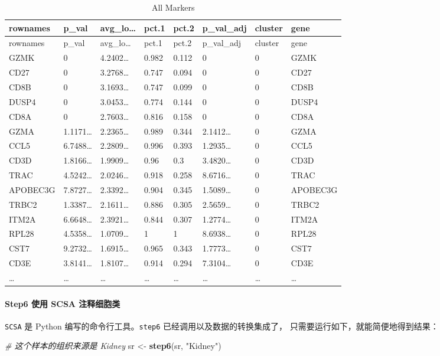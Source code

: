 \documentclass[
]{article}
\newenvironment{Shaded}{\begin{snugshade}}{\end{snugshade}}
\newcommand{\CommentTok}[1]{\textcolor[rgb]{0.56,0.35,0.01}{\textit{#1}}}
\newcommand{\KeywordTok}[1]{\textcolor[rgb]{0.13,0.29,0.53}{\textbf{#1}}}
\newcommand{\NormalTok}[1]{#1}
\newcommand{\StringTok}[1]{\textcolor[rgb]{0.31,0.60,0.02}{#1}}
\begin{document}
\begin{longtable}[]{@{}llllllll@{}}
\caption{\label{tab:All-Markers}All Markers}\tabularnewline
\toprule
rownames & p\_val & avg\_lo\ldots{} & pct.1 & pct.2 & p\_val\_adj & cluster & gene\tabularnewline
\midrule
\endfirsthead
\toprule
rownames & p\_val & avg\_lo\ldots{} & pct.1 & pct.2 & p\_val\_adj & cluster & gene\tabularnewline
\midrule
\endhead
GZMK & 0 & 4.2402\ldots{} & 0.982 & 0.112 & 0 & 0 & GZMK\tabularnewline
CD27 & 0 & 3.2768\ldots{} & 0.747 & 0.094 & 0 & 0 & CD27\tabularnewline
CD8B & 0 & 3.1693\ldots{} & 0.747 & 0.099 & 0 & 0 & CD8B\tabularnewline
DUSP4 & 0 & 3.0453\ldots{} & 0.774 & 0.144 & 0 & 0 & DUSP4\tabularnewline
CD8A & 0 & 2.7603\ldots{} & 0.816 & 0.158 & 0 & 0 & CD8A\tabularnewline
GZMA & 1.1171\ldots{} & 2.2365\ldots{} & 0.989 & 0.344 & 2.1412\ldots{} & 0 & GZMA\tabularnewline
CCL5 & 6.7488\ldots{} & 2.2809\ldots{} & 0.996 & 0.393 & 1.2935\ldots{} & 0 & CCL5\tabularnewline
CD3D & 1.8166\ldots{} & 1.9909\ldots{} & 0.96 & 0.3 & 3.4820\ldots{} & 0 & CD3D\tabularnewline
TRAC & 4.5242\ldots{} & 2.0246\ldots{} & 0.918 & 0.258 & 8.6716\ldots{} & 0 & TRAC\tabularnewline
APOBEC3G & 7.8727\ldots{} & 2.3392\ldots{} & 0.904 & 0.345 & 1.5089\ldots{} & 0 & APOBEC3G\tabularnewline
TRBC2 & 1.3387\ldots{} & 2.1611\ldots{} & 0.886 & 0.305 & 2.5659\ldots{} & 0 & TRBC2\tabularnewline
ITM2A & 6.6648\ldots{} & 2.3921\ldots{} & 0.844 & 0.307 & 1.2774\ldots{} & 0 & ITM2A\tabularnewline
RPL28 & 4.5358\ldots{} & 1.0709\ldots{} & 1 & 1 & 8.6938\ldots{} & 0 & RPL28\tabularnewline
CST7 & 9.2732\ldots{} & 1.6915\ldots{} & 0.965 & 0.343 & 1.7773\ldots{} & 0 & CST7\tabularnewline
CD3E & 3.8141\ldots{} & 1.8107\ldots{} & 0.914 & 0.294 & 7.3104\ldots{} & 0 & CD3E\tabularnewline
\ldots{} & \ldots{} & \ldots{} & \ldots{} & \ldots{} & \ldots{} & \ldots{} & \ldots{}\tabularnewline
\bottomrule
\end{longtable}

\hypertarget{run-scsa}{%
\paragraph{Step6 使用 SCSA 注释细胞类}\label{run-scsa}}

\texttt{SCSA} 是 Python 编写的命令行工具。\texttt{step6} 已经调用以及数据的转换集成了，
只需要运行如下，就能简便地得到结果：

\begin{Shaded}
\begin{Highlighting}[]
\CommentTok{\# 这个样本的组织来源是 Kidney}
\NormalTok{sr \textless{}{-}}\StringTok{ }\KeywordTok{step6}\NormalTok{(sr, }\StringTok{"Kidney"}\NormalTok{)}
\end{Highlighting}
\end{Shaded}
\end{document}
